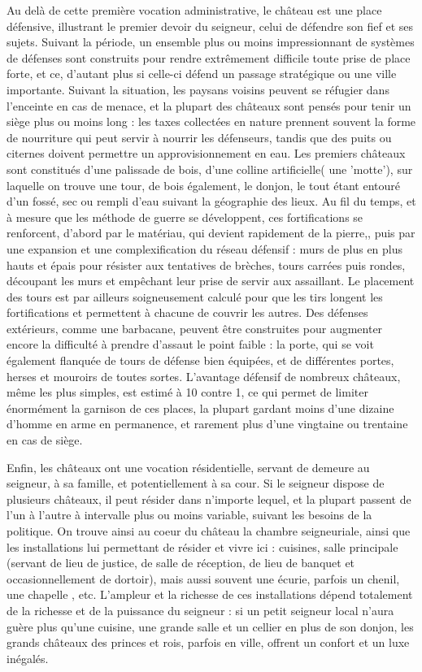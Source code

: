 \documentclass[10pt,a4paper]{book}
\begin{document}
\begin{multicols}{2}
Au delà de cette première vocation administrative, le château est une place défensive, illustrant le premier devoir du seigneur, celui de défendre son fief et ses sujets. Suivant la période, un ensemble plus ou moins impressionnant de systèmes de défenses sont construits pour rendre extrêmement difficile toute prise de place forte, et ce, d'autant plus si celle-ci défend un passage stratégique ou une ville importante. Suivant la situation, les paysans voisins peuvent se réfugier dans l'enceinte en cas de menace, et la plupart des châteaux sont pensés pour tenir un siège plus ou moins long : les taxes collectées en nature prennent souvent la forme de nourriture qui peut servir à nourrir les défenseurs, tandis que des puits ou citernes doivent permettre un approvisionnement en eau. Les premiers châteaux sont constitués d'une palissade de bois, d'une colline artificielle( une 'motte'), sur laquelle on trouve une tour, de bois également, le donjon, le tout étant entouré d'un fossé, sec ou rempli d'eau suivant la géographie des lieux. Au fil du temps, et à mesure que les méthode de guerre se développent, ces fortifications se renforcent, d'abord par le matériau, qui devient rapidement de la pierre,, puis par une expansion et une complexification du réseau défensif : murs de plus en plus hauts et épais pour résister aux tentatives de brèches, tours carrées puis rondes, découpant les murs et empêchant leur prise de servir aux assaillant. Le placement des tours est par ailleurs soigneusement calculé pour que les tirs longent les fortifications et permettent à chacune de couvrir les autres. Des défenses extérieurs, comme une barbacane, peuvent être construites pour augmenter encore la difficulté à prendre d'assaut le point faible : la porte, qui se voit également flanquée de tours de défense bien équipées, et de différentes portes, herses et mouroirs de toutes sortes. L'avantage défensif de nombreux châteaux, même les plus simples, est estimé à 10 contre 1, ce qui permet de limiter énormément la garnison de ces places, la plupart gardant moins d'une dizaine d'homme en arme en permanence, et rarement plus d'une vingtaine ou trentaine en cas de siège.

Enfin, les châteaux ont une vocation résidentielle, servant de demeure au seigneur, à sa famille, et potentiellement à sa cour. Si le seigneur dispose de plusieurs châteaux, il peut résider dans n'importe lequel, et la plupart passent de l'un à l'autre à intervalle plus ou moins variable, suivant les besoins de la politique. On trouve ainsi au coeur du château la chambre seigneuriale, ainsi que les installations lui permettant de résider et vivre ici : cuisines, salle principale (servant de lieu de justice, de salle de réception, de lieu de banquet et occasionnellement de dortoir), mais aussi souvent une écurie, parfois un chenil, une chapelle , etc. L'ampleur et la richesse de ces installations dépend totalement de la richesse et de la puissance du seigneur : si un petit seigneur local n'aura guère plus qu'une cuisine, une grande salle et un cellier en plus de son donjon, les grands châteaux des princes et rois, parfois en ville, offrent un confort et un luxe inégalés.


\end{multicols}
\end{document}
